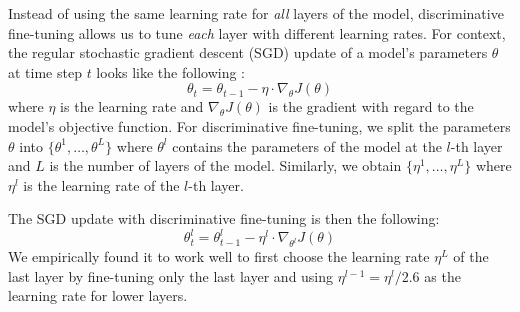 \documentclass[11pt,a4paper]{article}
\begin{document}
Instead of using the same learning rate for \emph{all} layers of the model, discriminative fine-tuning allows us to tune \emph{each} layer with different learning rates. For context, the regular stochastic gradient descent (SGD) update of a model's parameters $\theta$ at time step $t$ looks like the following \cite{ruder2016overview}:
\begin{equation}
\theta_{t} = \theta_{t-1} - \eta \cdot \nabla_\theta J(\theta)
\end{equation}
where $\eta$ is the learning rate and $\nabla_\theta J(\theta)$ is the gradient with regard to the model's objective function. For discriminative fine-tuning, we split the parameters $\theta$ into $\{\theta^1, \ldots, \theta^L \}$ where $\theta^l$ contains the parameters of the model at the $l$-th layer and $L$ is the number of layers of the model. Similarly, we obtain $\{\eta^1, \ldots, \eta^L \}$ where $\eta^l$ is the learning rate of the $l$-th layer.

The SGD update with discriminative fine-tuning is then the following:
\begin{equation}
\theta_{t}^l = \theta_{t-1}^l - \eta^l \cdot \nabla_{\theta^l} J(\theta)
\end{equation}
We empirically found it to work well to first choose the learning rate $\eta^L$ of the last layer by fine-tuning only the last layer and using $\eta^{l-1} = \eta^l / 2.6 $ as the learning rate for lower layers.
\end{document}
